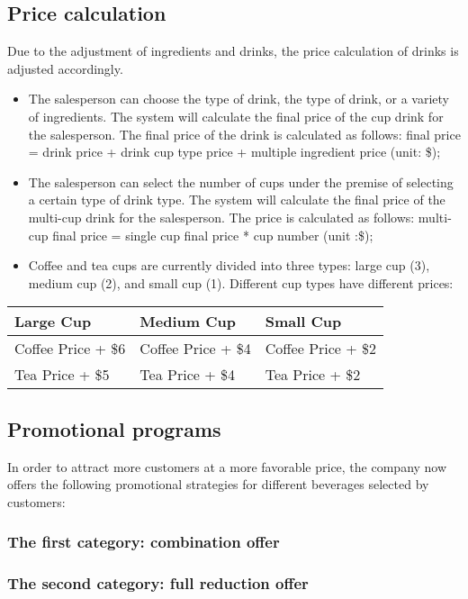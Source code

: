 \documentclass[a4paper]{report}
\begin{document}
\subsection{Price calculation}
Due to the adjustment of ingredients and drinks, the price calculation of drinks is adjusted accordingly.
\begin{itemize}
\item
The salesperson can choose the type of drink, the type of drink, or a variety of ingredients. The system will calculate the final price of the cup drink for the salesperson. The final price of the drink is calculated as follows: final price = drink price + drink cup type price + multiple ingredient price (unit: \$);
\item
The salesperson can select the number of cups under the premise of selecting a certain type of drink type. The system will calculate the final price of the multi-cup drink for the salesperson. The price is calculated as follows: multi-cup final price = single cup final price * cup number (unit :\$);
\item
Coffee and tea cups are currently divided into three types: large cup (3), medium cup (2), and small cup (1). Different cup types have different prices:
\end{itemize}
\begin{table}[htbp]
\center
\begin{tabular}{|l|l|l|}
\hline
\rowcolor[HTML]{575C61} 
{\color[HTML]{FFFFFF} \textbf{Large Cup}} & {\color[HTML]{FFFFFF} \textbf{Medium Cup}} & {\color[HTML]{FFFFFF}\textbf{Small Cup} } \\ \hline
Coffee Price +  \$6&Coffee Price +  \$4&Coffee Price +  \$2\\\hline
Tea Price +  \$5&Tea Price +  \$4&Tea Price +  \$2\\\hline
\end{tabular}
\end{table}
\subsection{Promotional programs}
In order to attract more customers at a more favorable price, the company now offers the following promotional strategies for different beverages selected by customers:
\subsubsection{The first category: combination offer}

\subsubsection{The second category: full reduction offer}
\end{document}
